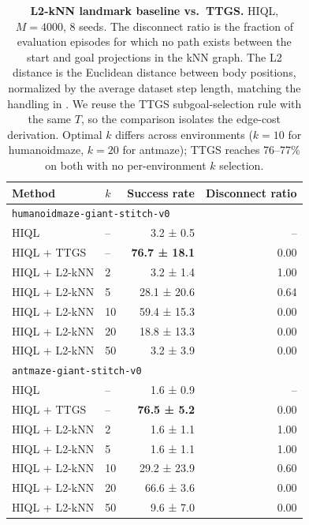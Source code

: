 \documentclass{article} %
\begin{document}
\begin{table}[H]
  \centering
  \small
  \caption{\textbf{L2-kNN landmark baseline vs.\ TTGS.} HIQL, $M{=}4000$, 8 seeds. The disconnect ratio is the fraction of evaluation episodes for which no path exists between the start and goal projections in the kNN graph. The L2 distance is the Euclidean distance between body positions, normalized by the average dataset step length, matching the handling in . We reuse the TTGS subgoal-selection rule with the same $T$, so the comparison isolates the edge-cost derivation. Optimal $k$ differs across environments ($k{=}10$ for humanoidmaze, $k{=}20$ for antmaze); TTGS reaches 76--77\% on both with no per-environment $k$ selection.}
  \label{tab:l2knn}
  \begin{tabular*}{0.85\linewidth}{@{\extracolsep{\fill}}llrr}
    \toprule
    Method & $k$ & Success rate & Disconnect ratio \\
    \midrule
    \multicolumn{4}{l}{\texttt{humanoidmaze-giant-stitch-v0}} \\
    HIQL              & --  & 3.2 ± 0.5    & --   \\
    HIQL + TTGS       & --  & \textbf{76.7 ± 18.1} & 0.00 \\
    HIQL + L2-kNN     & 2   & 3.2 ± 1.4    & 1.00 \\
    HIQL + L2-kNN     & 5   & 28.1 ± 20.6  & 0.64 \\
    HIQL + L2-kNN     & 10  & 59.4 ± 15.3  & 0.00 \\
    HIQL + L2-kNN     & 20  & 18.8 ± 13.3  & 0.00 \\
    HIQL + L2-kNN     & 50  & 3.2 ± 3.9    & 0.00 \\
    \midrule
    \multicolumn{4}{l}{\texttt{antmaze-giant-stitch-v0}} \\
    HIQL              & --  & 1.6 ± 0.9    & --   \\
    HIQL + TTGS       & --  & \textbf{76.5 ± 5.2}  & 0.00 \\
    HIQL + L2-kNN     & 2   & 1.6 ± 1.1    & 1.00 \\
    HIQL + L2-kNN     & 5   & 1.6 ± 1.1    & 1.00 \\
    HIQL + L2-kNN     & 10  & 29.2 ± 23.9  & 0.60 \\
    HIQL + L2-kNN     & 20  & 66.6 ± 3.6   & 0.00 \\
    HIQL + L2-kNN     & 50  & 9.6 ± 7.0    & 0.00 \\
    \bottomrule
  \end{tabular*}
\end{table}
\end{document}
